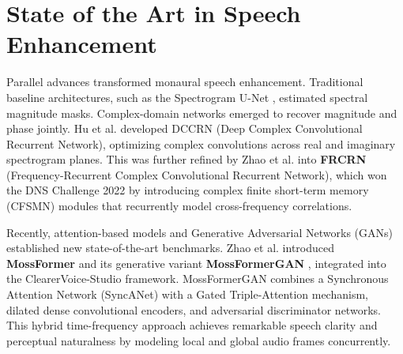 \documentclass[11pt,a4paper]{report}
\begin{document}
\section{State of the Art in Speech Enhancement}
Parallel advances transformed monaural speech enhancement. Traditional baseline architectures, such as the Spectrogram U-Net \cite{ronneberger2015u}, estimated spectral magnitude masks. Complex-domain networks emerged to recover magnitude and phase jointly. Hu et al. \cite{hu2020dccrn} developed DCCRN (Deep Complex Convolutional Recurrent Network), optimizing complex convolutions across real and imaginary spectrogram planes. This was further refined by Zhao et al. \cite{zhao2022frcrn} into \textbf{FRCRN} (Frequency-Recurrent Complex Convolutional Recurrent Network), which won the DNS Challenge 2022 by introducing complex finite short-term memory (CFSMN) modules that recurrently model cross-frequency correlations.

Recently, attention-based models and Generative Adversarial Networks (GANs) established new state-of-the-art benchmarks. Zhao et al. \cite{zhao2023mossformer} introduced \textbf{MossFormer} and its generative variant \textbf{MossFormerGAN} \cite{zhao2024mossformer2}, integrated into the ClearerVoice-Studio framework. MossFormerGAN combines a Synchronous Attention Network (SyncANet) with a Gated Triple-Attention mechanism, dilated dense convolutional encoders, and adversarial discriminator networks. This hybrid time-frequency approach achieves remarkable speech clarity and perceptual naturalness by modeling local and global audio frames concurrently.
\end{document}
